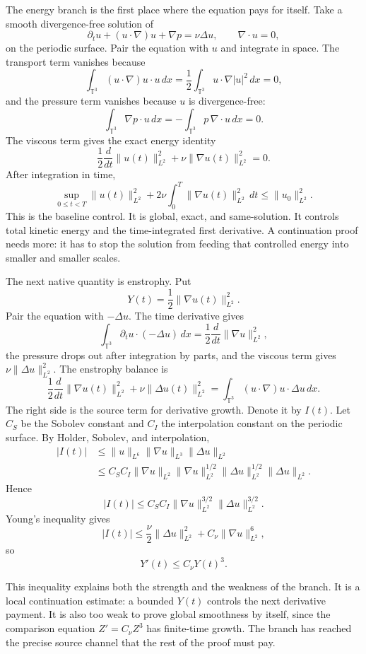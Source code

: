 The energy branch is the first place where the equation pays for itself.  Take
a smooth divergence-free solution of
\[
  \partial_t u+(u\cdot\nabla)u+\nabla p=\nu\Delta u,
  \qquad \nabla\cdot u=0,
\]
on the periodic surface.  Pair the equation with \(u\) and integrate in
space.  The transport term vanishes because
\[
  \int_{\mathbb T^3}(u\cdot\nabla)u\cdot u\,dx
  =
  \frac12\int_{\mathbb T^3}u\cdot\nabla |u|^2\,dx
  =0,
\]
and the pressure term vanishes because \(u\) is divergence-free:
\[
  \int_{\mathbb T^3}\nabla p\cdot u\,dx
  =
  -\int_{\mathbb T^3}p\,\nabla\cdot u\,dx
  =0.
\]
The viscous term gives the exact energy identity
\[
  \frac12\frac{d}{dt}\|u(t)\|_{L^2}^2
  +\nu\|\nabla u(t)\|_{L^2}^2=0.
\]
After integration in time,
\[
  \sup_{0\le t<T}\|u(t)\|_{L^2}^2
  +2\nu\int_0^T\|\nabla u(t)\|_{L^2}^2\,dt
  \le \|u_0\|_{L^2}^2.
\]
This is the baseline control.  It is global, exact, and same-solution.  It
controls total kinetic energy and the time-integrated first derivative.  A
continuation proof needs more: it has to stop the solution from feeding that
controlled energy into smaller and smaller scales.

The next native quantity is enstrophy.  Put
\[
  Y(t)=\frac12\|\nabla u(t)\|_{L^2}^2.
\]
Pair the equation with \(-\Delta u\).  The time derivative gives
\[
  \int_{\mathbb T^3}\partial_tu\cdot(-\Delta u)\,dx
  =
  \frac12\frac{d}{dt}\|\nabla u\|_{L^2}^2,
\]
the pressure drops out after integration by parts, and the viscous term gives
\(\nu\|\Delta u\|_{L^2}^2\).  The enstrophy balance is
\[
  \frac12\frac{d}{dt}\|\nabla u(t)\|_{L^2}^2
  +\nu\|\Delta u(t)\|_{L^2}^2
  =
  \int_{\mathbb T^3}(u\cdot\nabla)u\cdot\Delta u\,dx.
\]
The right side is the source term for derivative growth.  Denote it by
\(I(t)\).  Let \(C_S\) be the Sobolev constant and \(C_I\) the interpolation
constant on the periodic surface.  By Holder, Sobolev, and interpolation,
\[
  \begin{aligned}
  |I(t)|
  &\le
  \|u\|_{L^6}\|\nabla u\|_{L^3}\|\Delta u\|_{L^2}  \\
  &\le C_SC_I
  \|\nabla u\|_{L^2}
  \|\nabla u\|_{L^2}^{1/2}
  \|\Delta u\|_{L^2}^{1/2}
  \|\Delta u\|_{L^2}.
  \end{aligned}
\]
Hence
\[
  |I(t)|
  \le C_SC_I
  \|\nabla u\|_{L^2}^{3/2}\|\Delta u\|_{L^2}^{3/2}.
\]
Young's inequality gives
\[
  |I(t)|
  \le
  \frac{\nu}{2}\|\Delta u\|_{L^2}^2
  +C_\nu\|\nabla u\|_{L^2}^6,
\]
so
\[
  Y'(t)\le C_\nu Y(t)^3.
\]

This inequality explains both the strength and the weakness of the branch.
It is a local continuation estimate: a bounded \(Y(t)\) controls the next
derivative payment.  It is also too weak to prove global smoothness by
itself, since the comparison equation \(Z'=C_\nu Z^3\) has finite-time
growth.  The branch has reached the precise source channel that the rest of
the proof must pay.

